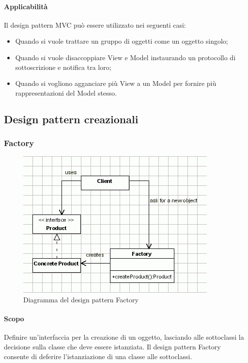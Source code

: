 \paragraph{Applicabilità\\}
Il design pattern\glossario{} MVC\glossario{} può essere utilizzato nei seguenti casi:
\begin{itemize}
\item Quando si vuole trattare un gruppo di oggetti come un oggetto singolo;
\item Quando si vuole disaccoppiare View e Model instaurando un protocollo di sottoscrizione e notifica tra loro;
\item Quando si vogliono agganciare più View a un Model per fornire più rappresentazioni del Model stesso.
\end{itemize} 
\pagebreak

\subsection{Design pattern creazionali}
\label{DPC}
\subsubsection{Factory}
\label{Factory}
\begin{figure} [!h]
	\centering
	\includegraphics[width=0.5\linewidth]{./Content/Immagini/Factory.png}
	\caption{Diagramma del design pattern Factory}
	\label{figFact}
\end{figure}

\paragraph{Scopo\\}
Definire un'interfaccia per la creazione di un oggetto, lasciando alle sottoclassi la decisione sulla classe che deve essere istanziata. Il design pattern\glossario{} Factory consente di deferire l'istanziazione di una classe alle sottoclassi.

